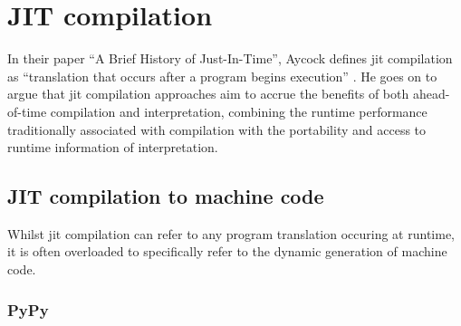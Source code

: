 





















\section{JIT compilation}
\label{sec:jit-compilation}

In their paper ``A Brief History of Just-In-Time'', Aycock defines \acf{jit} compilation as ``translation that occurs after a program begins execution'' \cite{aycockBriefHistoryJustintime2003}.
He goes on to argue that \ac{jit} compilation approaches aim to accrue the benefits of both ahead-of-time compilation and interpretation, combining the runtime performance traditionally associated with compilation with the portability and access to runtime information of interpretation.

\subsection{JIT compilation to machine code}
\label{ssec:jit-compilation-machine-code}

Whilst \acf{jit} compilation can refer to any program translation occuring at runtime, it is often overloaded to specifically refer to the dynamic generation of machine code.


\subsubsection{PyPy}
\label{sssec:pypy}



